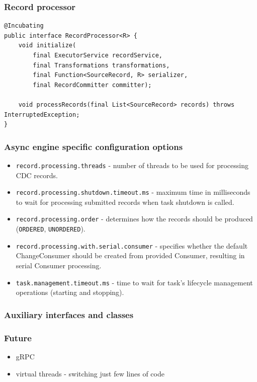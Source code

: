 \documentclass[10pt,utf8]{beamer}
\begin{document}
\begin{frame}[fragile]
    \frametitle{Record processor}
    \begin{lstlisting}[style=java]
@Incubating
public interface RecordProcessor<R> {
    void initialize(
        final ExecutorService recordService,
        final Transformations transformations,
        final Function<SourceRecord, R> serializer,
        final RecordCommitter committer);

    void processRecords(final List<SourceRecord> records) throws InterruptedException;
}
    \end{lstlisting}
\end{frame}

\begin{frame}
    \frametitle{Async engine specific configuration options}
    \begin{itemize}
        \item \texttt{record.processing.threads} - number of threads to be used for processing CDC records.
        \item \texttt{record.processing.shutdown.timeout.ms} - maximum time in milliseconds to wait for processing submitted records when task shutdown is called.
        \item \texttt{record.processing.order} - determines how the records should be produced (\texttt{ORDERED}, \texttt{UNORDERED}).
        \item \texttt{record.processing.with.serial.consumer} - specifies whether the default ChangeConsumer should be created from provided Consumer, resulting in serial Consumer processing.
        \item \texttt{task.management.timeout.ms} - time to wait for task's lifecycle management operations (starting and stopping).
    \end{itemize}
\end{frame}

\begin{frame}
    \frametitle{Auxiliary interfaces and classes}
\end{frame}


\begin{frame}
    \frametitle{Future}
    \begin{itemize}
        \item gRPC
        \item virtual threads  - switching just few lines of code
    \end{itemize}
\end{frame}
\end{document}
